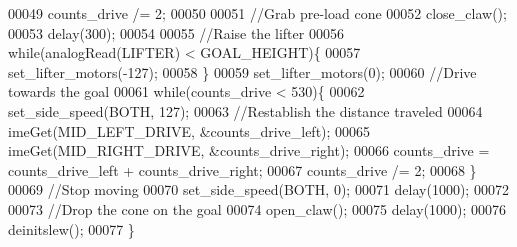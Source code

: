 \begin{DoxyCode}
00049   counts\_drive /= 2;
00050 
00051   \textcolor{comment}{//Grab pre-load cone}
00052   close_claw();
00053   delay(300);
00054 
00055   \textcolor{comment}{//Raise the lifter}
00056   \textcolor{keywordflow}{while}(analogRead(LIFTER) < GOAL_HEIGHT)\{
00057     set_lifter_motors(-127);
00058   \}
00059   set_lifter_motors(0);
00060   \textcolor{comment}{//Drive towards the goal}
00061   \textcolor{keywordflow}{while}(counts\_drive < 530)\{
00062     set_side_speed(BOTH, 127);
00063     \textcolor{comment}{//Restablish the distance traveled}
00064     imeGet(MID_LEFT_DRIVE, &counts\_drive\_left);
00065     imeGet(MID_RIGHT_DRIVE, &counts\_drive\_right);
00066     counts\_drive = counts\_drive\_left + counts\_drive\_right;
00067     counts\_drive /= 2;
00068   \}
00069   \textcolor{comment}{//Stop moving}
00070   set_side_speed(BOTH, 0);
00071   delay(1000);
00072 
00073   \textcolor{comment}{//Drop the cone on the goal}
00074   open_claw();
00075   delay(1000);
00076   deinitslew();
00077 \}
\end{DoxyCode}
